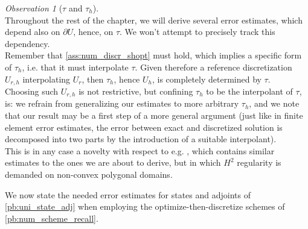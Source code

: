 \documentclass[english,a4paper,10pt,oneside]{scrbook}	%
\theoremstyle{break}
\theoremstyle{remark}
\newtheorem{obs}[equation]{Observation}
\begin{document}
\begin{obs}[$\tau$ and $\tau_h$]
\label{obs:tau_vs_tau_h}
\mbox{}\\
Throughout the rest of the chapter, we will derive several error estimates, which depend also on $\partial U$, hence, on $\tau$. We won't attempt to precisely track this dependency.
\mbox{}\\

 
Remember that \cref{ass:num_discr_shopt} must hold, which implies a specific form of $\tau_h$, i.e. that it must interpolate $\tau$. Given therefore a reference discretization $U_{r,h}$ interpolating $U_r$, then $\tau_h$, hence $U_h$, is completely determined by $\tau$. \mbox{}\\
Choosing such $U_{r,h}$ is not restrictive, but confining $\tau_h$ to be the interpolant of $\tau$, is: we refrain from generalizing our estimates to more arbitrary $\tau_h$, and we note that our result may be a first step of a more general argument (just like in finite element error estimates, the error between exact and discretized solution is decomposed into two parts by the introduction of a suitable interpolant).  \mbox{}\\


This is in any case a novelty with respect to e.g. \cite{paganini}, which contains similar estimates to the ones we are about to derive, but in which $H^2$ regularity is demanded on non-convex polygonal domains. \mbox{}\\
\end{obs}


We now state the needed error estimates for states and adjoints of \cref{pb:uni_state_adj} when employing the optimize-then-discretize schemes of \cref{pb:num_scheme_recall}.
\end{document}
